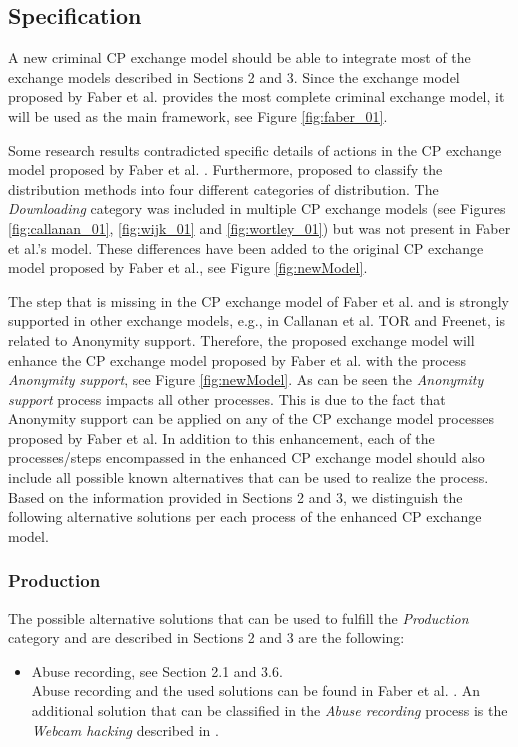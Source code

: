 \documentclass{sig-alternate-br}
\begin{document}
\subsection{Specification}
A new criminal CP exchange model should be able to integrate most of the exchange models described in Sections 2 and 3. 
Since the exchange model proposed by Faber et al. \cite{en2011phishing} provides the most complete criminal exchange model, it will be used as the main framework, see Figure \ref{fig:faber_01}.

Some research results contradicted specific details of actions in the CP exchange model proposed by Faber et al. \cite{quayle2002paedophiles,krone2005international}. Furthermore, \cite{wijk2009achter} proposed to classify the distribution methods into four different categories of distribution. The \textit{Downloading} category was included in multiple CP exchange models (see Figures \ref{fig:callanan_01}, \ref{fig:wijk_01} and \ref{fig:wortley_01}) but was not present in Faber et al.'s model.
These differences have been added to the original CP exchange model proposed by Faber et al., see Figure \ref{fig:newModel}.

The step that is missing in the CP exchange model of Faber et al. and is strongly supported in other exchange models, e.g., in Callanan et al. \cite{callanan2009internet} TOR and Freenet, is related to Anonymity support. Therefore, the proposed exchange model will enhance the CP exchange model proposed by Faber et al. with the process \textit{Anonymity support}, see Figure \ref{fig:newModel}. As can be seen the \textit{Anonymity support} process impacts all other processes. This is due to the fact that Anonymity support can be applied on any of the CP exchange model processes proposed by Faber et al.
In addition to this enhancement, each of the processes/steps encompassed in the enhanced CP exchange model should also include all possible known alternatives that can be used to realize the process. 
Based on the information provided in Sections 2 and 3, we distinguish the following alternative solutions per each process of the enhanced CP exchange model.
\subsubsection{Production}
The possible alternative solutions that can be used to fulfill the \textit{Production} category and are described in Sections 2 and 3 are the following:
\begin{itemize}
	\item Abuse recording, see Section 2.1 and 3.6.\\
		Abuse recording and the used solutions can be found in Faber et al. \cite{en2011phishing}. An additional solution that can be classified in the \textit{Abuse recording} process is the \textit{Webcam hacking} described in \cite{mishna2009ongoing,salomon2010examples}.
\end{itemize}
\end{document}
